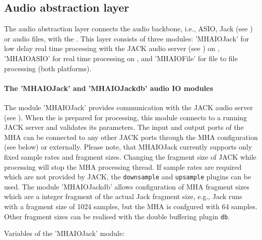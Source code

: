 
\subsection{Audio abstraction layer}%
\label{sec:audioabstraction}

The audio abstraction layer connects the audio backbone, i.e., ASIO,
Jack (see ) or audio files, with the \mhad{}.
%
This layer consists of three modules: 'MHAIOJack' for low delay real
time processing with the JACK audio server (see )
on \Linux{}, 'MHAIOASIO' for real time processing on \Windows{}, and
'MHAIOFile' for file to file processing (both platforms).

\paragraph{The 'MHAIOJack' and 'MHAIOJackdb' audio IO modules}%
%
%

The module 'MHAIOJack' provides communication with the JACK audio
server (see ).
%
When the \mhad{} is prepared for processing, this module connects to a
running JACK server and validates its parameters. The input and output
ports of the MHA can be connected to any other JACK ports through the
MHA configuration (see below) or externally. Please note, that
MHAIOJack currently supports only fixed sample rates and fragment
sizes. Changing the fragment size of JACK while processing will stop
the MHA processing thread. If sample rates are required which are not
provided by JACK, the {\tt downsample} and {\tt upsample} plugins can
be used. The module 'MHAIOJackdb' allows configuration of MHA fragment
sizes which are a integer fragment of the actual Jack fragment size,
e.g., Jack runs with a fragment size of 1024 samples, but the MHA is
confgured with 64 samples.  Other fragment sizes can be realised with
the double buffering plugin {\tt db}.

Variables of the 'MHAIOJack' module:

